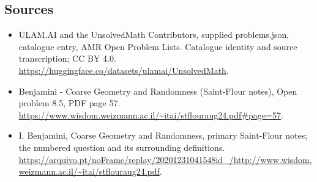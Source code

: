 \documentclass[11pt,a4paper]{article}
\begin{document}
\subsection{Sources}
\begin{itemize}
\item[S1] ULAM.AI and the UnsolvedMath Contributors, supplied problems.json, catalogue entry, AMR Open Problem Lists. Catalogue identity and source transcription; CC BY 4.0.
\url{https://huggingface.co/datasets/ulamai/UnsolvedMath}.
\item[S2] Benjamini - Coarse Geometry and Randomness (Saint-Flour notes), Open problem 8.5, PDF page 57. 
\url{https://www.wisdom.weizmann.ac.il/~itai/stflouraug24.pdf#page=57}.
\item[S3] I. Benjamini, Coarse Geometry and Randomness, primary Saint-Flour notes; the numbered question and its surrounding definitions.
\url{https://arquivo.pt/noFrame/replay/20201231041548id_/http://www.wisdom.weizmann.ac.il/~itai/stflouraug24.pdf}.
\end{itemize}
\end{document}
